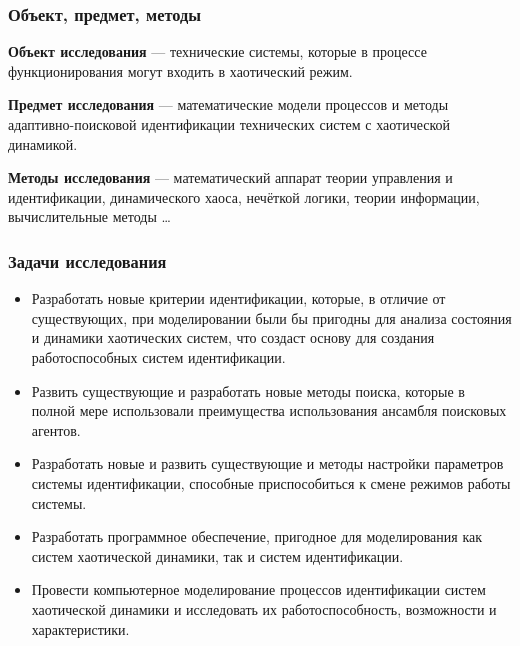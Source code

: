\documentclass[10pt,utf8]{beamer}
\begin{document}

\begin{frame}
  \frametitle{Объект, предмет, методы}

\textbf{Объект исследования} ---
технические системы, которые в процессе функционирования
могут входить в хаотический режим.

\medskip

\textbf{Предмет исследования} ---
математические модели процессов и методы
адаптивно-поисковой идентификации технических систем с хаотической динамикой.

\medskip

\textbf{Методы исследования} ---
математический аппарат теории управления и идентификации,
динамического хаоса,
нечёткой логики,
теории информации,
вычислительные методы
\ldots

\end{frame}




\begin{frame}
  \frametitle{Задачи исследования}

  \begin{itemize}

    \item
      Разработать новые критерии идентификации, которые, в отличие от существующих,
      при моделировании были бы пригодны для анализа состояния и динамики хаотических
      систем, что создаст основу для создания работоспособных систем идентификации.

    \item
      Развить существующие и разработать новые методы поиска, которые в полной мере
      использовали преимущества использования ансамбля поисковых агентов.

    \item
      Разработать новые и развить существующие и  методы настройки параметров системы
      идентификации, способные приспособиться к смене режимов работы системы.

    \item
      Разработать программное обеспечение, пригодное для моделирования как систем
      хаотической динамики, так и систем идентификации.

    \item
      Провести компьютерное моделирование процессов идентификации систем хаотической
      динамики и исследовать их работоспособность, возможности и характеристики.

  \end{itemize}

\end{frame}
\end{document}

